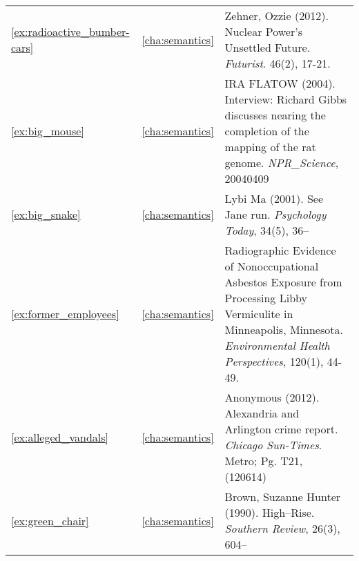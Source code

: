 \begin{longtable}{lcp{8.5cm}}
\ref{ex:radioactive_bumber-cars}&\ref{cha:semantics}&Zehner, Ozzie (2012). Nuclear Power's Unsettled Future. \emph{Futurist}. 46(2), 17-21.\\
\ref{ex:big_mouse}&\ref{cha:semantics}&IRA FLATOW (2004). Interview: Richard Gibbs discusses nearing the completion of the mapping of the rat genome. \emph{NPR\_Science}, 20040409\\
\ref{ex:big_snake}&\ref{cha:semantics}&Lybi Ma (2001). See Jane run. \emph{Psychology Today}, 34(5), 36--\\ 
\ref{ex:former_employees}&\ref{cha:semantics}&Radiographic Evidence of Nonoccupational Asbestos Exposure from Processing Libby Vermiculite in Minneapolis, Minnesota. \emph{Environmental Health Perspectives}, 120(1), 44-49.\\
\ref{ex:alleged_vandals}&\ref{cha:semantics}&Anonymous (2012). Alexandria and Arlington crime report. \emph{Chicago Sun-Times}. Metro; Pg. T21, (120614)\\
\ref{ex:green_chair}&\ref{cha:semantics}&Brown, Suzanne Hunter (1990). High--Rise. \emph{Southern Review}, 26(3), 604--\\  

\end{longtable}
